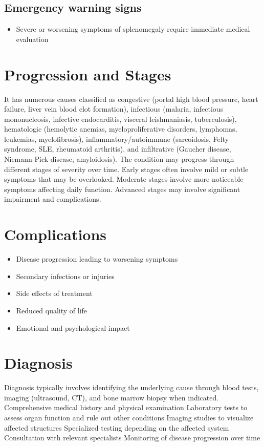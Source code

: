\subsection{Emergency warning signs}
\begin{itemize}[noitemsep]
  \item Severe or worsening symptoms of splenomegaly require immediate medical evaluation
\end{itemize}
\section{Progression and Stages}
It has numerous causes classified as congestive (portal high blood pressure, heart failure, liver vein blood clot formation), infectious (malaria, infectious mononucleosis, infective endocarditis, visceral leishmaniasis, tuberculosis), hematologic (hemolytic anemias, myeloproliferative disorders, lymphomas, leukemias, myelofibrosis), inflammatory/autoimmune (sarcoidosis, Felty syndrome, SLE, rheumatoid arthritis), and infiltrative (Gaucher disease, Niemann-Pick disease, amyloidosis). The condition may progress through different stages of severity over time. Early stages often involve mild or subtle symptoms that may be overlooked. Moderate stages involve more noticeable symptoms affecting daily function. Advanced stages may involve significant impairment and complications.
\section{Complications}
\begin{itemize}[noitemsep]
  \item Disease progression leading to worsening symptoms
  \item Secondary infections or injuries
  \item Side effects of treatment
  \item Reduced quality of life
  \item Emotional and psychological impact
\end{itemize}
\section{Diagnosis}
Diagnosis typically involves identifying the underlying cause through blood tests, imaging (ultrasound, CT), and bone marrow biopsy when indicated. Comprehensive medical history and physical examination Laboratory tests to assess organ function and rule out other conditions Imaging studies to visualize affected structures Specialized testing depending on the affected system Consultation with relevant specialists Monitoring of disease progression over time


